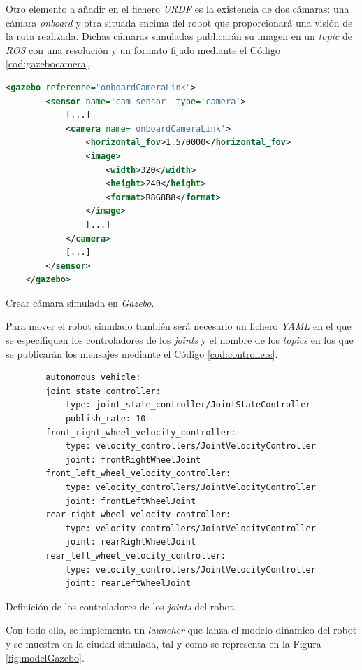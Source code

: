 Otro elemento a añadir en el fichero \textit{URDF} es la existencia de dos cámaras: una cámara \textit{onboard} y otra situada encima del robot que proporcionará una visión de la ruta realizada. Dichas cámaras simuladas publicarán su imagen en un \textit{topic} de \textit{ROS} con una resolución y un formato fijado mediante el Código \ref{cod:gazebocamera}.\\

\begin{code}[h]
	\begin{lstlisting}[language=XML]
	<gazebo reference="onboardCameraLink">
		<sensor name='cam_sensor' type='camera'>
			[...]
			<camera name='onboardCameraLink'>
				<horizontal_fov>1.570000</horizontal_fov>
				<image>
					<width>320</width>
					<height>240</height>
					<format>R8G8B8</format>
				</image>
				[...]
			</camera>
			[...]
		</sensor>
	</gazebo>
	\end{lstlisting}
	\caption[Crear cámara simulada en \textit{Gazebo}.]{Crear cámara simulada en \textit{Gazebo}.}
	\label{cod:gazebocamera}
\end{code}

Para mover el robot simulado también será necesario un fichero \textit{YAML} en el que se especifiquen los controladores de los \textit{joints} y el nombre de los \textit{topics} en los que se publicarán los mensajes mediante el Código \ref{cod:controllers}.\\

\begin{code}[h]
	\begin{lstlisting}
		autonomous_vehicle:
		joint_state_controller:
			type: joint_state_controller/JointStateController
			publish_rate: 10
		front_right_wheel_velocity_controller:
			type: velocity_controllers/JointVelocityController
			joint: frontRightWheelJoint
		front_left_wheel_velocity_controller:
			type: velocity_controllers/JointVelocityController
			joint: frontLeftWheelJoint
		rear_right_wheel_velocity_controller:
			type: velocity_controllers/JointVelocityController
			joint: rearRightWheelJoint
		rear_left_wheel_velocity_controller:
			type: velocity_controllers/JointVelocityController
			joint: rearLeftWheelJoint
	\end{lstlisting}
	\caption[Definición de los controladores de los \textit{joints} del robot.]{Definición de los controladores de los \textit{joints} del robot.}
	\label{cod:controllers}
\end{code}

Con todo ello, se implementa un \textit{launcher} que lanza el modelo dińamico del robot y se muestra en la ciudad simulada, tal y como se representa en la Figura \ref{fig:modelGazebo}.\\

